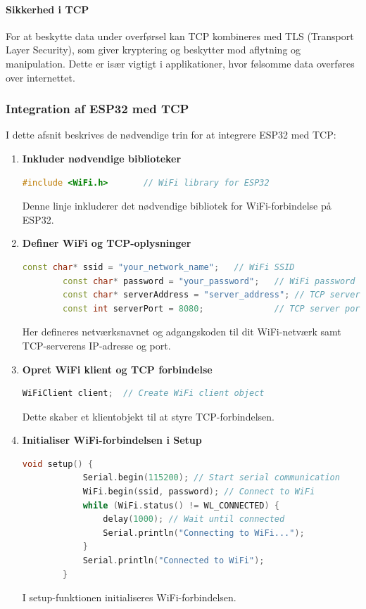 \paragraph{Sikkerhed i TCP}
For at beskytte data under overførsel kan TCP kombineres med TLS (Transport Layer Security), som giver kryptering og beskytter mod aflytning og manipulation. Dette er især vigtigt i applikationer, hvor følsomme data overføres over internettet.

\subsubsection{Integration af ESP32 med TCP}
I dette afsnit beskrives de nødvendige trin for at integrere ESP32 med TCP:

\begin{enumerate}
	\item \textbf{Inkluder nødvendige biblioteker}
	\begin{lstlisting}[language=C++, caption=Syntaks]
		#include <WiFi.h>       // WiFi library for ESP32
	\end{lstlisting}
	\noindent Denne linje inkluderer det nødvendige bibliotek for WiFi-forbindelse på ESP32.
	
	\item \textbf{Definer WiFi og TCP-oplysninger}
	\begin{lstlisting}[language=C++, caption=Syntaks]
		const char* ssid = "your_network_name";   // WiFi SSID
		const char* password = "your_password";   // WiFi password
		const char* serverAddress = "server_address"; // TCP server IP address
		const int serverPort = 8080;              // TCP server port
	\end{lstlisting}
	\noindent Her defineres netværksnavnet og adgangskoden til dit WiFi-netværk samt TCP-serverens IP-adresse og port.
	
	\item \textbf{Opret WiFi klient og TCP forbindelse}
	\begin{lstlisting}[language=C++, caption=Syntaks]
		WiFiClient client;  // Create WiFi client object
	\end{lstlisting}
	\noindent Dette skaber et klientobjekt til at styre TCP-forbindelsen.
	
	\item \textbf{Initialiser WiFi-forbindelsen i Setup}
	\begin{lstlisting}[language=C++, caption=Syntaks]
		void setup() {
			Serial.begin(115200); // Start serial communication
			WiFi.begin(ssid, password); // Connect to WiFi
			while (WiFi.status() != WL_CONNECTED) {
				delay(1000); // Wait until connected
				Serial.println("Connecting to WiFi...");
			}
			Serial.println("Connected to WiFi");
		}
	\end{lstlisting}
	\noindent I setup-funktionen initialiseres WiFi-forbindelsen.
	

\end{enumerate}
